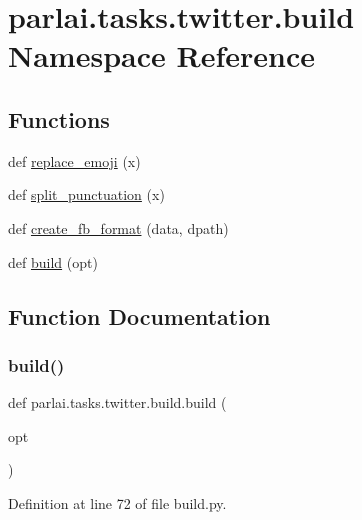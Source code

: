 \hypertarget{namespaceparlai_1_1tasks_1_1twitter_1_1build}{}\section{parlai.\+tasks.\+twitter.\+build Namespace Reference}
\label{namespaceparlai_1_1tasks_1_1twitter_1_1build}
\subsection*{Functions}
\begin{DoxyCompactItemize}
\item 
def \hyperlink{namespaceparlai_1_1tasks_1_1twitter_1_1build_aea2acf2542f3fb1294fa121bb7cb1a76}{replace\+\_\+emoji} (x)
\item 
def \hyperlink{namespaceparlai_1_1tasks_1_1twitter_1_1build_a6296215f669301c1e46b7588e1291ae7}{split\+\_\+punctuation} (x)
\item 
def \hyperlink{namespaceparlai_1_1tasks_1_1twitter_1_1build_ab36b25b09bea28cdf3278f910e5e9ff6}{create\+\_\+fb\+\_\+format} (data, dpath)
\item 
def \hyperlink{namespaceparlai_1_1tasks_1_1twitter_1_1build_a8faa6a4ae6f2adaa22f068cc6781898d}{build} (opt)
\end{DoxyCompactItemize}


\subsection{Function Documentation}
\mbox{\label{namespaceparlai_1_1tasks_1_1twitter_1_1build_a8faa6a4ae6f2adaa22f068cc6781898d}} 
\subsubsection{\texorpdfstring{build()}{build()}}
{\footnotesize\ttfamily def parlai.\+tasks.\+twitter.\+build.\+build (\begin{DoxyParamCaption}\item[{}]{opt }\end{DoxyParamCaption})}



Definition at line 72 of file build.\+py.



